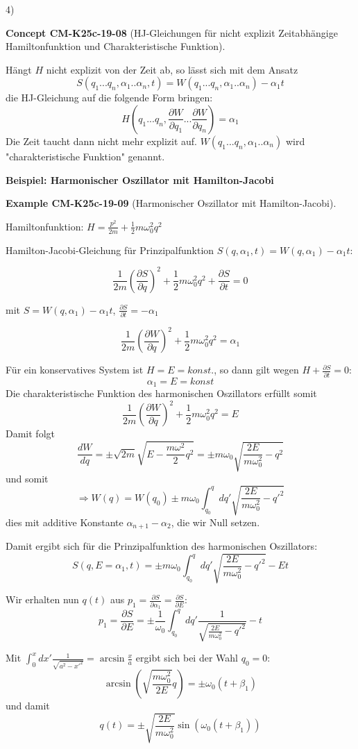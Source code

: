 \documentclass[10pt, letterpaper]{article}
\newcommand{\CustomHeading}[3]{%
  \par\medskip\noindent%
  \textbf{#1 #2} \textnormal{(#3)}.\enskip%
}
\newenvironment{EXA}[2]{\begin{unitbox}\CustomHeading{Example}{#1}{#2}}{\end{unitbox}}
\newenvironment{CONC}[2]{\begin{unitbox}\CustomHeading{Concept}{#1}{#2}}{\end{unitbox}}
\begin{document}
4) 

\begin{CONC}{CM-K25c-19-08}{HJ-Gleichungen für nicht explizit Zeitabhängige Hamiltonfunktion und Charakteristische Funktion}
Hängt $H$ nicht explizit von der Zeit ab, so lässt sich mit dem Ansatz
\[
S(q_1...q_n,\alpha_1..\alpha_n,t) = W(q_1...q_n,\alpha_1..\alpha_n) - \alpha_1t
\]
die HJ-Gleichung auf die folgende Form bringen:
\[
H\left(q_1...q_n,\frac{\partial W}{\partial q_1}...\frac{\partial W}{\partial q_n}\right) = \alpha_1
\]
Die Zeit taucht dann nicht mehr explizit auf. $W(q_1...q_n,\alpha_1..\alpha_n)$ wird "charakteristische Funktion" genannt.
\end{CONC}



\textbf{Beispiel: Harmonischer Oszillator mit Hamilton-Jacobi}

\begin{EXA}{CM-K25c-19-09}{Harmonischer Oszillator mit Hamilton-Jacobi}
Hamiltonfunktion: $H = \frac{p^2}{2m} + \frac{1}{2}m\omega_0^2q^2$

Hamilton-Jacobi-Gleichung für Prinzipalfunktion $S(q,\alpha_1,t) = W(q,\alpha_1) - \alpha_1t$:

\[
\frac{1}{2m}\left(\frac{\partial S}{\partial q}\right)^2 + \frac{1}{2}m\omega_0^2q^2 + \frac{\partial S}{\partial t} = 0
\]

mit $S = W(q,\alpha_1) - \alpha_1t$, $\frac{\partial S}{\partial t} = -\alpha_1$

\[
\frac{1}{2m}\left(\frac{\partial W}{\partial q}\right)^2 + \frac{1}{2}m\omega_0^2q^2 = \alpha_1
\]

Für ein konservatives System ist $H = E = konst.$, so dann gilt wegen $H + \frac{\partial S}{\partial t} = 0$: 
$$\alpha_1 = E = konst$$
Die charakteristische Funktion des harmonischen Oszillators erfüllt somit
\[
\frac{1}{2m}\left(\frac{\partial W}{\partial q}\right)^2 + \frac{1}{2}m\omega_0^2q^2 = E
\]
Damit folgt
\[
\frac{dW}{dq} = \pm \sqrt{2m}\sqrt{E-\frac{m\omega^2}{2}q^2} = \pm m\omega_0\sqrt{\frac{2E}{m\omega_0^2}-q^2}
\]
und somit
\[
\Rightarrow W(q) = W(q_0) \pm m\omega_0 \int_{q_0}^q dq'\sqrt{\frac{2E}{m\omega_0^2}-q'^2}
\]
dies mit additive Konstante $\alpha_{n+1}-\alpha_2$, die wir Null setzen.

\noindent
Damit ergibt sich für die Prinzipalfunktion des harmonischen Oszillators:
\[
S(q,E=\alpha_1,t) = \pm m\omega_0\int_{q_0}^q dq'\sqrt{\frac{2E}{m\omega_0^2}-q'^2} - Et
\]

Wir erhalten nun $q(t)$ aus $p_1=\frac{\partial S}{\partial \alpha_1} = \frac{\partial S}{\partial E}$:
\[
p_1 = \frac{\partial S}{\partial E} = \pm \frac{1}{\omega_0}\int_{q_0}^q dq'\frac{1}{\sqrt{\frac{2E}{m\omega_0^2}-q'^2}} - t
\]

Mit $\int_0^x dx'\frac{1}{\sqrt{a^2-x'^2}} = \arcsin\frac{x}{a}$ ergibt sich bei der Wahl $q_0=0$:
\[
\arcsin\left(\sqrt{\frac{m\omega_0^2}{2E}}q\right) = \pm \omega_0(t+\beta_1)
\]
und damit
\[
q(t) = \pm \sqrt{\frac{2E}{m\omega_0^2}}\sin(\omega_0(t+\beta_1))
\]
\end{EXA}
\end{document}
